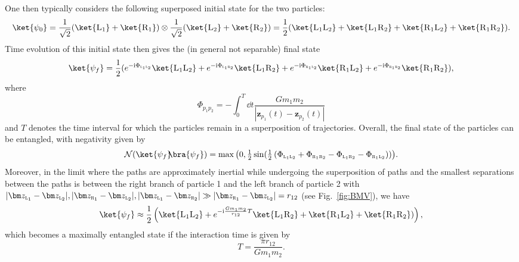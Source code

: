 \documentclass[letterpaper,12pt,titlepage,oneside,final]{book}
\newcommand{\ii}{\mathrm{i}}
\newcommand{\tc}[1]{\textsc{#1}}
\begin{document}
One then typically considers the following superposed initial state for the two particles:
\begin{equation}\label{eq:initialBMV}
    \ket{\psi_0} = \frac{1}{\sqrt{2}}(\ket{\tc{L}_1} + \ket{\tc{R}_1})\otimes \frac{1}{\sqrt{2}}(\ket{\tc{L}_2} + \ket{\tc{R}_2}) = \frac{1}{2}(\ket{\tc{L}_1\tc{L}_2}+\ket{\tc{L}_1\tc{R}_2}+\ket{\tc{R}_1\tc{L}_2}+\ket{\tc{R}_1\tc{R}_2}).
\end{equation}
Time evolution of this initial state then gives the (in general not separable) final state
\begin{equation}
    \ket{\psi_f} = \frac{1}{2}(e^{-\ii \Phi_{\tc{l}_1\tc{l}_2}}\ket{\tc{L}_1\tc{L}_2}+e^{-\ii \Phi_{\tc{l}_1\tc{r}_2}}\ket{\tc{L}_1\tc{R}_2}+e^{-\ii \Phi_{\tc{r}_1\tc{l}_2}}\ket{\tc{R}_1\tc{L}_2}+e^{-\ii \Phi_{\tc{r}_1\tc{r}_2}}\ket{\tc{R}_1\tc{R}_2}),
\end{equation}
where
\begin{equation}
    \Phi_{p_1p_2} = - \int_0^{T} \dd t \frac{Gm_1m_2}{|\bm z_{p_1}(t) - \bm z_{p_2}(t)|}
\end{equation}
and $T$ denotes the time interval for which the particles remain in a superposition of trajectories. Overall, the final state of the particles can be entangled, with negativity given by
\begin{equation}
    \mathcal{N}(\ket{\psi_f}\!\!\bra{\psi_f}) = \max\big(0,\tfrac{1}{2}\sin(\tfrac{1}{2}\left(\Phi_{\tc{l}_1\tc{l}_2} + \Phi_{\tc{r}_1\tc{r}_2} - \Phi_{\tc{l}_1\tc{r}_2} - \Phi_{\tc{r}_1\tc{l}_2}\right))\big).\label{eq:NegBMVbasic}
\end{equation}
Moreover, in the limit where the paths are approximately inertial while undergoing the superposition of paths and the smallest separations between the paths is between the right branch of particle 1 and the left branch of particle 2 with $|\bm z_{\tc{l}_1} - \bm z_{\tc{l}_2}|, |\bm z_{\tc{r}_1} - \bm z_{\tc{l}_2}|,|\bm z_{\tc{l}_1} - \bm z_{\tc{r}_2}|\gg |\bm z_{\tc{r}_1} - \bm z_{\tc{l}_2}| = r_{12}$ (see Fig.~\eqref{fig:BMV}), we have
\begin{equation}
    \ket{\psi_f} \approx \frac{1}{2}\left(\ket{\tc{L}_1\tc{L}_2}+e^{- \ii \frac{G m_1m_2}{r_{12}}T}\ket{\tc{L}_1\tc{R}_2}+\ket{\tc{R}_1\tc{L}_2}+\ket{\tc{R}_1\tc{R}_2})\right),
\end{equation}
which becomes a maximally entangled state if the interaction time is given by
\begin{equation}
    T =  \frac{\pi r_{12}}{Gm_1m_2}.
\end{equation}
\end{document}
